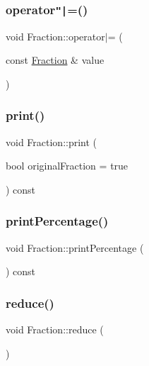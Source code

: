 \subsubsection{\texorpdfstring{operator\texttt{"|}=()}{operator|=()}}
{\footnotesize\ttfamily void Fraction\+::operator$\vert$= (\begin{DoxyParamCaption}\item[{const \hyperlink{class_fraction}{Fraction} \&}]{value }\end{DoxyParamCaption})}

\hypertarget{class_fraction_a053300eed15ed1783a4316f9b7bf8a4f}{}\label{class_fraction_a053300eed15ed1783a4316f9b7bf8a4f} 
\subsubsection{\texorpdfstring{print()}{print()}}
{\footnotesize\ttfamily void Fraction\+::print (\begin{DoxyParamCaption}\item[{bool}]{original\+Fraction = {\ttfamily true} }\end{DoxyParamCaption}) const}

\hypertarget{class_fraction_a08ffc86159f5b96b10df4bfdf2f5c0a5}{}\label{class_fraction_a08ffc86159f5b96b10df4bfdf2f5c0a5} 
\subsubsection{\texorpdfstring{print\+Percentage()}{printPercentage()}}
{\footnotesize\ttfamily void Fraction\+::print\+Percentage (\begin{DoxyParamCaption}{ }\end{DoxyParamCaption}) const}

\hypertarget{class_fraction_a8eee4d9ddb8a3484930f7fa5f7ca3ae7}{}\label{class_fraction_a8eee4d9ddb8a3484930f7fa5f7ca3ae7} 
\subsubsection{\texorpdfstring{reduce()}{reduce()}}
{\footnotesize\ttfamily void Fraction\+::reduce (\begin{DoxyParamCaption}{ }\end{DoxyParamCaption})}



